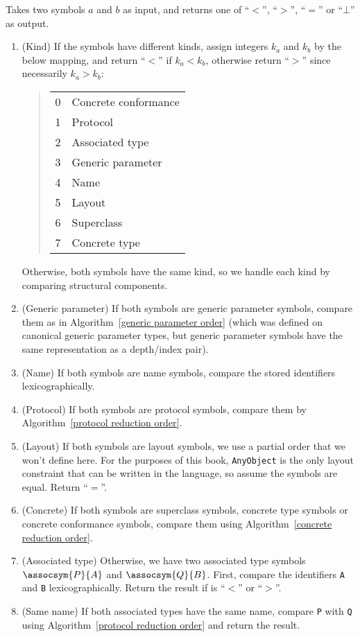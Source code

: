 \documentclass[../generics]{subfiles}
\begin{document}
\begin{algorithm}\label{symbol reduction order}
Takes two symbols $a$ and $b$ as input, and returns one of ``$<$'', ``$>$'', ``$=$'' or ``$\bot$'' as output.
\begin{enumerate}
\item (Kind) If the symbols have different kinds, assign integers $k_a$ and $k_b$ by the below mapping, and return ``$<$'' if $k_a<k_b$, otherwise return ``$>$'' since necessarily $k_a>k_b$:
\begin{quote}
\begin{tabular}{|l|l|}
\hline
0&Concrete conformance\\
1&Protocol\\
2&Associated type\\
3&Generic parameter\\
4&Name\\
5&Layout\\
6&Superclass\\
7&Concrete type\\
\hline
\end{tabular}
\end{quote}
Otherwise, both symbols have the same kind, so we handle each kind by comparing structural components.
%
\item (Generic parameter) If both symbols are generic parameter symbols, compare them as in Algorithm~\ref{generic parameter order} (which was defined on canonical generic parameter types, but generic parameter symbols have the same representation as a depth/index pair).
%
%
\item (Name) If both symbols are name symbols, compare the stored identifiers lexicographically.
%
\item (Protocol) If both symbols are protocol symbols, compare them by Algorithm~\ref{protocol reduction order}.
%
\item (Layout) If both symbols are layout symbols, we use a partial order that we won't define here. For the purposes of this book, \texttt{AnyObject} is the only layout constraint that can be written in the language, so assume the symbols are equal. Return ``$=$''.
\item (Concrete) If both symbols are superclass symbols, concrete type symbols or concrete conformance symbols, compare them using Algorithm~\ref{concrete reduction order}.
%
\item (Associated type) Otherwise, we have two associated type symbols $\assocsym{P}{A}$ and $\assocsym{Q}{B}$. First, compare the identifiers \texttt{A} and \texttt{B} lexicographically. Return the result if is ``$<$'' or ``$>$''.
\item (Same name) If both associated types have the same name, compare \texttt{P} with \texttt{Q} using Algorithm~\ref{protocol reduction order} and return the result.
\end{enumerate}
\end{algorithm}
\end{document}
